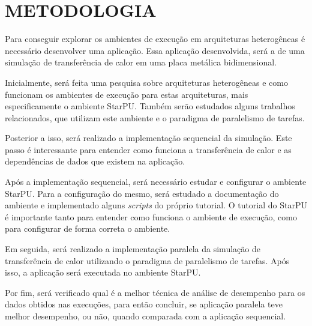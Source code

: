
\chapter{METODOLOGIA}
\label{chap:metodologia}

Para conseguir explorar os ambientes de execução em arquiteturas heterogêneas é necessário desenvolver uma aplicação. 
Essa aplicação desenvolvida, será a de uma simulação de transferência de calor em uma placa metálica bidimensional.

Inicialmente, será feita uma pesquisa sobre arquiteturas heterogêneas e como funcionam os ambientes de execução para estas arquiteturas,
mais especificamente o ambiente StarPU.
Também serão estudados alguns trabalhos relacionados, que utilizam este ambiente e o paradigma de paralelismo de tarefas.

Posterior a isso, será realizado a implementação sequencial da simulação.
Este passo é interessante para entender como funciona a transferência de calor e as dependências de dados que existem na aplicação.

Após a implementação sequencial, será necessário estudar e configurar o ambiente StarPU. Para a configuração do mesmo,
será estudado a documentação do ambiente e implementado alguns \textit{scripts} do próprio tutorial.
O tutorial do StarPU é importante tanto para entender como funciona o ambiente de execução, como para configurar de forma correta o ambiente.

Em seguida, será realizado a implementação paralela da simulação de transferência de calor utilizando o paradigma de paralelismo de tarefas.
Após isso, a aplicação será executada no ambiente StarPU.

Por fim, será verificado qual é a melhor técnica de análise de desempenho para os dados obtidos nas execuções, para então concluir, se aplicação paralela teve melhor desempenho, ou não, quando comparada com a aplicação sequencial.